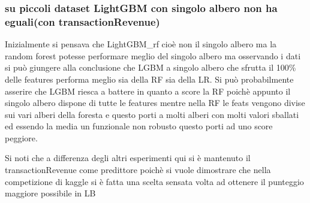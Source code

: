 \documentclass[11pt]{article}
\begin{document}
\subsubsection{su piccoli dataset LightGBM con singolo albero non ha
eguali(con
transactionRevenue)}\label{su-piccoli-dataset-lightgbm-con-singolo-albero-non-ha-egualicon-transactionrevenue}

Inizialmente si pensava che LightGBM\_rf cioè non il singolo albero ma
la random forest potesse performare meglio del singolo albero ma
osservando i dati si può giungere alla conclusione che LGBM a singolo
albero che sfrutta il 100\% delle features performa meglio sia della RF
sia della LR. Si può probabilmente asserire che LGBM riesca a battere in
quanto a score la RF poichè appunto il singolo albero dispone di tutte
le features mentre nella RF le feats vengono divise sui vari alberi
della foresta e questo porti a molti alberi con molti valori sballati ed
essendo la media un funzionale non robusto questo porti ad uno score
peggiore.

Si noti che a differenza degli altri esperimenti qui si è mantenuto il
transactionRevenue come predittore poichè si vuole dimostrare che nella
competizione di kaggle si è fatta una scelta sensata volta ad ottenere
il punteggio maggiore possibile in LB
\end{document}
